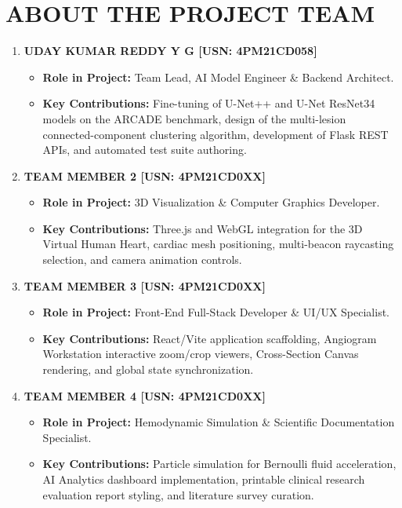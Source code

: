\chapter{ABOUT THE PROJECT TEAM}
\label{app:appendix_e}

\begin{enumerate}
    \item \textbf{UDAY KUMAR REDDY Y G [USN: 4PM21CD058]}
    \begin{itemize}
        \item \textbf{Role in Project:} Team Lead, AI Model Engineer \& Backend Architect.
        \item \textbf{Key Contributions:} Fine-tuning of U-Net++ and U-Net ResNet34 models on the ARCADE benchmark, design of the multi-lesion connected-component clustering algorithm, development of Flask REST APIs, and automated test suite authoring.
    \end{itemize}

    \item \textbf{TEAM MEMBER 2 [USN: 4PM21CD0XX]}
    \begin{itemize}
        \item \textbf{Role in Project:} 3D Visualization \& Computer Graphics Developer.
        \item \textbf{Key Contributions:} Three.js and WebGL integration for the 3D Virtual Human Heart, cardiac mesh positioning, multi-beacon raycasting selection, and camera animation controls.
    \end{itemize}

    \item \textbf{TEAM MEMBER 3 [USN: 4PM21CD0XX]}
    \begin{itemize}
        \item \textbf{Role in Project:} Front-End Full-Stack Developer \& UI/UX Specialist.
        \item \textbf{Key Contributions:} React/Vite application scaffolding, Angiogram Workstation interactive zoom/crop viewers, Cross-Section Canvas rendering, and global state synchronization.
    \end{itemize}

    \item \textbf{TEAM MEMBER 4 [USN: 4PM21CD0XX]}
    \begin{itemize}
        \item \textbf{Role in Project:} Hemodynamic Simulation \& Scientific Documentation Specialist.
        \item \textbf{Key Contributions:} Particle simulation for Bernoulli fluid acceleration, AI Analytics dashboard implementation, printable clinical research evaluation report styling, and literature survey curation.
    \end{itemize}
\end{enumerate}
